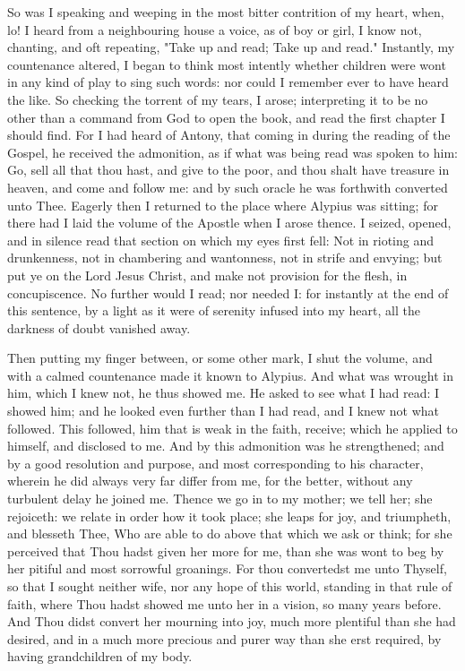 \documentclass[b5paper,openright,12pt,twoside]{book}
\begin{document}
So was I speaking and weeping in the most bitter contrition of my heart,
when, lo! I heard from a neighbouring house a voice, as of boy or girl,
I know not, chanting, and oft repeating, "Take up and read; Take up and
read." Instantly, my countenance altered, I began to think most intently
whether children were wont in any kind of play to sing such words: nor
could I remember ever to have heard the like. So checking the torrent
of my tears, I arose; interpreting it to be no other than a command from
God to open the book, and read the first chapter I should find. For I
had heard of Antony, that coming in during the reading of the Gospel,
he received the admonition, as if what was being read was spoken to him:
Go, sell all that thou hast, and give to the poor, and thou shalt have
treasure in heaven, and come and follow me: and by such oracle he was
forthwith converted unto Thee. Eagerly then I returned to the place
where Alypius was sitting; for there had I laid the volume of the
Apostle when I arose thence. I seized, opened, and in silence read that
section on which my eyes first fell: Not in rioting and drunkenness, not
in chambering and wantonness, not in strife and envying; but put ye
on the Lord Jesus Christ, and make not provision for the flesh, in
concupiscence. No further would I read; nor needed I: for instantly at
the end of this sentence, by a light as it were of serenity infused into
my heart, all the darkness of doubt vanished away.

Then putting my finger between, or some other mark, I shut the volume,
and with a calmed countenance made it known to Alypius. And what was
wrought in him, which I knew not, he thus showed me. He asked to see
what I had read: I showed him; and he looked even further than I had
read, and I knew not what followed. This followed, him that is weak in
the faith, receive; which he applied to himself, and disclosed to me.
And by this admonition was he strengthened; and by a good resolution and
purpose, and most corresponding to his character, wherein he did always
very far differ from me, for the better, without any turbulent delay he
joined me. Thence we go in to my mother; we tell her; she rejoiceth: we
relate in order how it took place; she leaps for joy, and triumpheth,
and blesseth Thee, Who are able to do above that which we ask or think;
for she perceived that Thou hadst given her more for me, than she
was wont to beg by her pitiful and most sorrowful groanings. For thou
convertedst me unto Thyself, so that I sought neither wife, nor any hope
of this world, standing in that rule of faith, where Thou hadst showed
me unto her in a vision, so many years before. And Thou didst convert
her mourning into joy, much more plentiful than she had desired, and
in a much more precious and purer way than she erst required, by having
grandchildren of my body.
\end{document}
